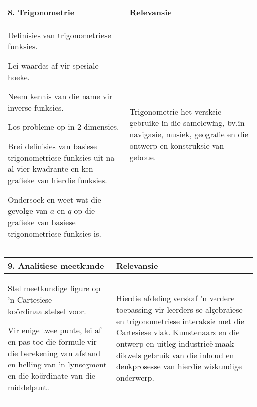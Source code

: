\begin{table}[H]
 \begin{center} 
\begin{tabular}{|p{8.5cm}|p{3.5cm}|} \hline
\textbf{8. Trigonometrie}& \textbf{Relevansie}\\ \hline  

Definisies van trigonometriese funksies.\par
Lei waardes af vir spesiale hoeke.\par
Neem kennis van die name vir inverse funksies.\par
Los probleme op in 2 dimensies.\par
Brei definisies van basiese trigonometriese funksies uit na al vier kwadrante en ken grafieke van hierdie funksies.\par
Ondersoek en weet wat die gevolge van $a$ en $q$ op die grafieke van basiese trigonometriese funksies is.\par
&
Trigonometrie het verskeie gebruike in die samelewing, bv.\@ in
navigasie, musiek, geografie en die ontwerp en konstruksie van
geboue.
\\ \hline

 \end{tabular}
\end{center}
\end{table}

\begin{table}[H]
 \begin{center} 
\begin{tabular}{|p{8.5cm}|p{3.5cm}|} \hline
\textbf{9. Analitiese meetkunde}&  \textbf{Relevansie} \\ \hline  
Stel meetkundige figure op 'n Cartesiese ko\"{o}rdinaatstelsel voor.\par
Vir enige twee punte, lei af en pas toe die formule vir die berekening
van afstand en helling van 'n lynsegment en die ko\"{o}rdinate van die
middelpunt.
&
Hierdie afdeling verskaf 'n verdere toepassing vir leerders se
algebra\"{i}ese en trigonometriese interaksie met die Cartesiese
vlak. Kunstenaars en die ontwerp en uitleg industrie\"{e} maak dikwels
gebruik van die inhoud en denkprosesse van hierdie wiskundige onderwerp.
\\ \hline

 \end{tabular}
\end{center}
\end{table}

